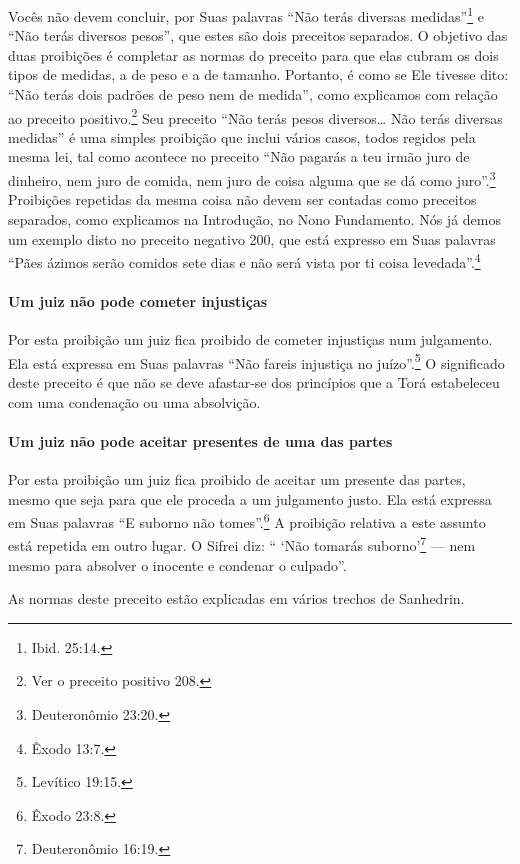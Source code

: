 Vocês não devem concluir, por Suas palavras ``Não terás diversas
medidas''\footnote{Ibid. 25:14.} e ``Não terás diversos pesos'', que estes são
dois preceitos separados. O objetivo das duas proibições é completar as
normas do preceito para que elas cubram os dois tipos de medidas, a de
peso e a de tamanho. Portanto, é como se Ele tivesse dito: ``Não terás
dois padrões de peso nem de medida'', como explicamos com relação ao
preceito positivo.\footnote{Ver o preceito positivo 208.} Seu preceito ``Não terás pesos
diversos\ldots{} Não terás diversas medidas'' é uma simples proibição que
inclui vários casos, todos regidos pela mesma lei, tal como acontece no
preceito ``Não pagarás a teu irmão juro de dinheiro, nem juro de comida,
nem juro de coisa alguma que se dá como juro''.\footnote{Deuteronômio 23:20.}
Proibições repetidas da mesma coisa não devem ser contadas como
preceitos separados, como explicamos na Introdução, no Nono Fundamento.
Nós já demos um exemplo disto no preceito negativo 200, que está
expresso em Suas palavras ``Pães ázimos serão comidos sete dias e não
será vista por ti coisa levedada''.\footnote{Êxodo 13:7.}

\paragraph{Um juiz não pode cometer injustiças}

Por esta proibição um juiz fica proibido de cometer injustiças num
julgamento. Ela está expressa em Suas palavras ``Não fareis injustiça no
juízo''.\footnote{Levítico 19:15.} O significado deste preceito é que não se deve
afastar-se dos princípios que a Torá estabeleceu com uma condenação ou
uma absolvição.

\paragraph{Um juiz não pode aceitar presentes de uma das partes}

Por esta proibição um juiz fica proibido de aceitar um presente das
partes, mesmo que seja para que ele proceda a um julgamento justo. Ela
está expressa em Suas palavras ``E suborno não tomes''.\footnote{Êxodo 23:8.} A
proibição relativa a este assunto está repetida em outro lugar. O Sifrei
diz: `` `Não tomarás suborno'\footnote{Deuteronômio 16:19.} --- nem mesmo para
absolver o inocente e condenar o culpado''.

As normas deste preceito estão explicadas em vários trechos de Sanhedrin.

